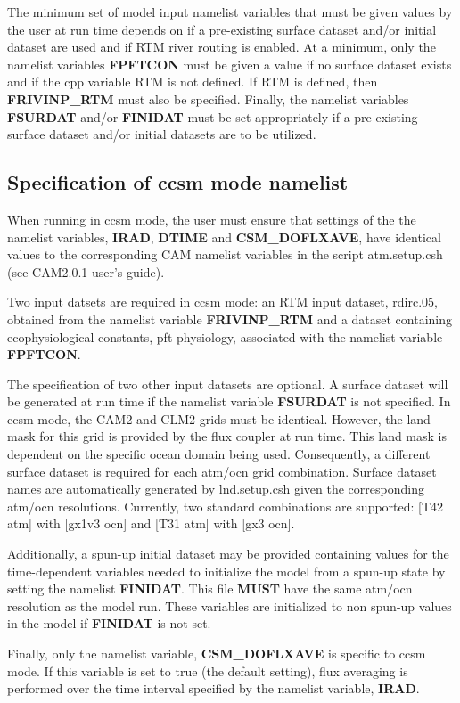 The minimum set of model input namelist variables that must be given
values by the user at run time depends on if a pre-existing surface
dataset and/or initial dataset are used and if RTM river routing is
enabled.  At a minimum, only the namelist variables {\bf FPFTCON} must
be given a value if no surface dataset exists and if the cpp variable
RTM is not defined. If RTM is defined, then {\bf FRIVINP\_RTM} must
also be specified.  Finally, the namelist variables {\bf FSURDAT}
and/or {\bf FINIDAT} must be set appropriately if a pre-existing
surface dataset and/or initial datasets are to be utilized.

\subsection {Specification of ccsm mode namelist}

When running in ccsm mode, the user must ensure that settings of the
the namelist variables, {\bf IRAD}, {\bf DTIME} and {\bf
CSM\_DOFLXAVE}, have identical values to the corresponding CAM
namelist variables in the script atm.setup.csh (see CAM2.0.1 user's
guide).

Two input datsets are required in ccsm mode: an RTM input dataset,
rdirc.05, obtained from the namelist variable {\bf FRIVINP\_RTM} and
a dataset containing ecophysiological constants, pft-physiology,
associated with the namelist variable {\bf FPFTCON}.

The specification of two other input datasets are optional.  A surface
dataset will be generated at run time if the namelist variable {\bf
FSURDAT} is not specified.  In ccsm mode, the CAM2 and CLM2 grids
must be identical. However, the land mask for this grid is provided by
the flux coupler at run time. This land mask is dependent on the
specific ocean domain being used.  Consequently, a different surface
dataset is required for each atm/ocn grid combination.  Surface
dataset names are automatically generated by lnd.setup.csh given the
corresponding atm/ocn resolutions.  Currently, two standard
combinations are supported: [T42 atm] with [gx1v3 ocn] and [T31 atm]
with [gx3 ocn].

Additionally, a spun-up initial dataset may be provided containing
values for the time-dependent variables needed to initialize the model
from a spun-up state by setting the namelist {\bf FINIDAT}. This file
{\bf MUST} have the same atm/ocn resolution as the model run.  These
variables are initialized to non spun-up values in the model if {\bf
FINIDAT} is not set.

Finally, only the namelist variable, {\bf CSM\_DOFLXAVE} is specific
to ccsm mode. If this variable is set to true (the default setting),
flux averaging is performed over the time interval specified by the
namelist variable, {\bf IRAD}.

